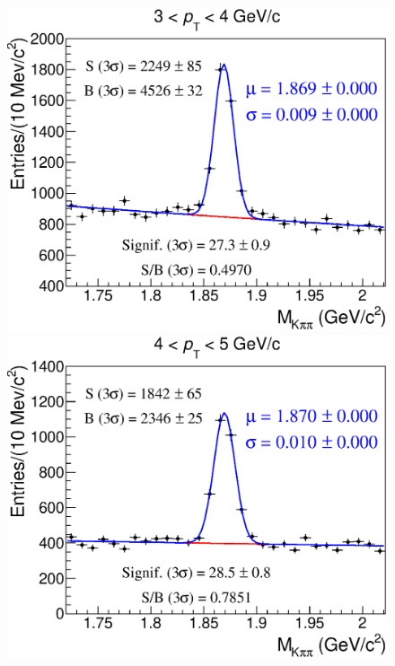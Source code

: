 \documentclass[b5paper,10pt,twoside,oldstyle,classica]{toptesi}
\begin{document}
\begin{figure}[h]
\begin{center}
\vspace{0cm}
{\includegraphics[scale = 0.25]{MassFits_cutset1_2.eps}}
\hspace{0cm}
{\includegraphics[scale = 0.25]{MassFits_cutset1_3.eps}}
\vspace{0cm}

\end{center}
\end{figure}
\end{document}
